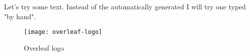 \documentclass[crop=false]{standalone}
\begin{document}
Let's try some text. Instead of the automatically generated
I will try one typed "by hand".

\begin{figure}
\centering
\texttt{[image: overleaf-logo]}
\label{fig:lionfigure}
\caption{Overleaf logo}
\end{figure}

\blindtext
\end{document}
